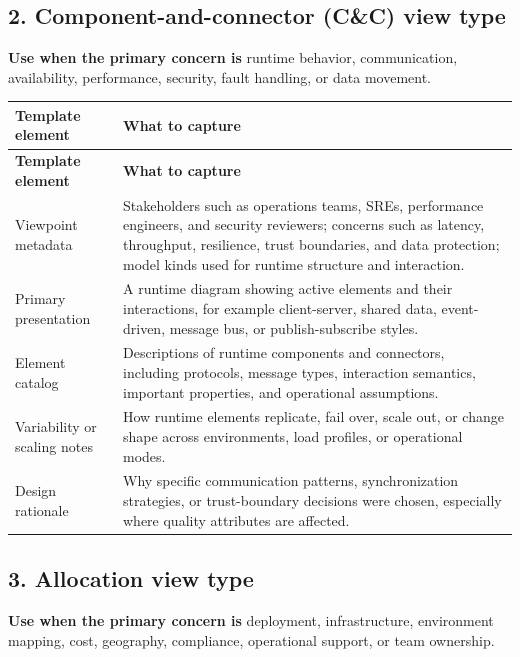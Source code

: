 \documentclass[11pt]{article}
\begin{document}
\subsection{2. Component-and-connector (C\&C) view type}

\textbf{Use when the primary concern is} runtime behavior, communication, availability, performance, security, fault handling, or data movement.

\begin{longtable}{@{}P{0.26\textwidth}P{0.69\textwidth}@{}}
\textbf{Template element} & \textbf{What to capture} \\
\toprule
\endfirsthead
{}
\textbf{Template element} & \textbf{What to capture} \\
\toprule
\endhead
Viewpoint metadata & Stakeholders such as operations teams, SREs, performance engineers, and security reviewers; concerns such as latency, throughput, resilience, trust boundaries, and data protection; model kinds used for runtime structure and interaction. \\
Primary presentation & A runtime diagram showing active elements and their interactions, for example client-server, shared data, event-driven, message bus, or publish-subscribe styles. \\
Element catalog & Descriptions of runtime components and connectors, including protocols, message types, interaction semantics, important properties, and operational assumptions. \\
Variability or scaling notes & How runtime elements replicate, fail over, scale out, or change shape across environments, load profiles, or operational modes. \\
Design rationale & Why specific communication patterns, synchronization strategies, or trust-boundary decisions were chosen, especially where quality attributes are affected. \\
\bottomrule
\end{longtable}

\subsection{3. Allocation view type}

\textbf{Use when the primary concern is} deployment, infrastructure, environment mapping, cost, geography, compliance, operational support, or team ownership.
\end{document}
